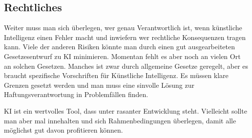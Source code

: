 \subsection{\normalsize{Rechtliches}}
Weiter muss man sich überlegen, wer genau Verantwortlich ist, wenn künstliche Intelligenz einen Fehler macht und inwiefern wer rechtliche Konsequenzen tragen kann.
Viele der anderen Risiken könnte man durch einen gut ausgearbeiteten Gesetzesentwurf zu KI minimieren. 
Momentan fehlt es aber noch an vielen Ort an solchen Gesetzen. Manches ist zwar durch allgemeine Gesetze geregelt, aber es braucht spezifische Vorschriften für Künstliche Intelligenz.
Es müssen klare Grenzen gesetzt werden und man muss eine sinvolle Lösung zur Haftungsverantwortung in Problemfällen finden.

KI ist ein wertvolles Tool, dass unter rasanter Entwicklung steht. Vielleicht sollte man aber mal innehalten und sich Rahmenbedingungen überlegen, damit alle möglichst gut davon profitieren können.